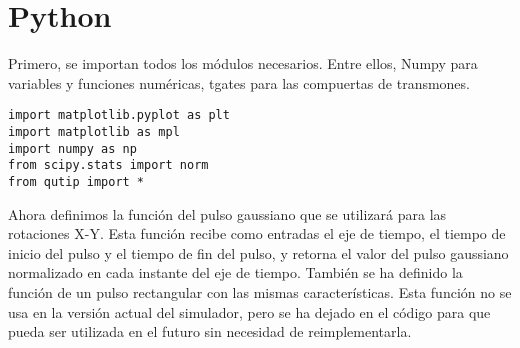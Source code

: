 \begin{doublespace}
\\
\\
\\
\\
\\
\\
\\
\\
\\
\\
\)
\end{doublespace}


\section{Python}

Primero, se importan todos los módulos necesarios. Entre ellos, Numpy para variables y funciones numéricas, tgates para las compuertas de transmones.

\begin{verbatim}
import matplotlib.pyplot as plt
import matplotlib as mpl
import numpy as np
from scipy.stats import norm
from qutip import *
\end{verbatim}

Ahora definimos la función del pulso gaussiano que se utilizará para las rotaciones X-Y. Esta función recibe como entradas el eje de tiempo, el tiempo de inicio del pulso y el tiempo de fin del pulso, y retorna el valor del pulso gaussiano normalizado en cada instante del eje de tiempo. También se ha definido la función de un pulso rectangular con las mismas características. Esta función no se usa en la versión actual del simulador, pero se ha dejado en el código para que pueda ser utilizada en el futuro sin necesidad de reimplementarla.

